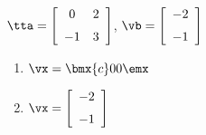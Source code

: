 {$\tta = \left[ \begin {array}{cc} 0&2\\\noalign{\medskip}-1&3\end {array}
 \right]$, $\vb=\left[ \begin {array}{c} -2\\\noalign{\medskip}-1\end {array}
 \right]$}
{\begin{enumerate}
\item	 $\vx=\bmx{c}0\\0\emx$
\item	 $\vx=\left[ \begin {array}{c} -2\\\noalign{\medskip}-1\end {array}
 \right]$
 \end{enumerate}
 }








